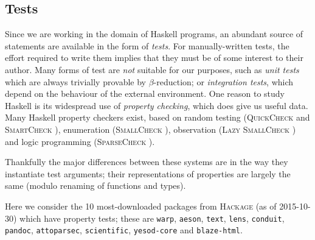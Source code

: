 \subsection{Tests} \label{sec:tests}

Since we are working in the domain of Haskell programs, an abundant source of
statements are available in the form of \emph{tests}. For manually-written
tests, the effort required to write them implies that they must be of some
interest to their author. Many forms of test are \emph{not} suitable for our
purposes, such as \emph{unit tests} which are always trivially provable by
$\beta$-reduction; or \emph{integration tests}, which depend on the behaviour of
the external environment. One reason to study Haskell is its widespread use of
\emph{property checking}, which does give us useful data. Many Haskell property
checkers exist, based on random testing (\textsc{QuickCheck}
\cite{claessen2011quickcheck} and \textsc{SmartCheck}
\cite{pike2014smartcheck}), enumeration (\textsc{SmallCheck}
\cite{runciman2008smallcheck}), observation (\textsc{Lazy SmallCheck}
\cite{reich2013advances}) and logic programming (\textsc{SparseCheck}
\cite{sparsecheck}).

Thankfully the major differences between these systems are in the way they
instantiate test arguments; their representations of properties are largely the
same (modulo renaming of functions and types).

Here we consider the 10 most-downloaded packages from \textsc{Hackage} (as of
2015-10-30) which have property tests; these are \texttt{warp}, \texttt{aeson},
\texttt{text}, \texttt{lens}, \texttt{conduit}, \texttt{pandoc},
\texttt{attoparsec}, \texttt{scientific}, \texttt{yesod-core} and
\texttt{blaze-html}.

